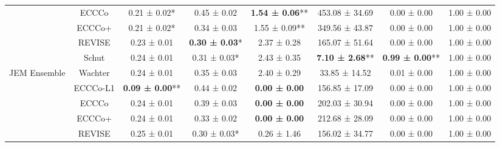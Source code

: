 \begin{table}
{\begin{tabular}[t]{cccccccc}
 & ECCCo & 0.21 ± 0.02*\hphantom{*} & 0.45 ± 0.02\hphantom{*}\hphantom{*} & \textbf{1.54 ± 0.06}** & 453.08 ± 34.69\hphantom{*}\hphantom{*} & 0.00 ± 0.00\hphantom{*}\hphantom{*} & 1.00 ± 0.00\hphantom{*}\hphantom{*}\\

 & ECCCo+ & 0.21 ± 0.02*\hphantom{*} & 0.34 ± 0.03\hphantom{*}\hphantom{*} & 1.55 ± 0.09** & 349.56 ± 43.87\hphantom{*}\hphantom{*} & 0.00 ± 0.00\hphantom{*}\hphantom{*} & 1.00 ± 0.00\hphantom{*}\hphantom{*}\\

 & REVISE & 0.23 ± 0.01\hphantom{*}\hphantom{*} & \textbf{0.30 ± 0.03}*\hphantom{*} & 2.37 ± 0.28\hphantom{*}\hphantom{*} & 165.07 ± 51.64\hphantom{*}\hphantom{*} & 0.00 ± 0.00\hphantom{*}\hphantom{*} & 1.00 ± 0.00\hphantom{*}\hphantom{*}\\

 & Schut & 0.24 ± 0.01\hphantom{*}\hphantom{*} & 0.31 ± 0.03*\hphantom{*} & 2.43 ± 0.35\hphantom{*}\hphantom{*} & \textbf{7.10 ± 2.68}** & \textbf{0.99 ± 0.00}** & 1.00 ± 0.00\hphantom{*}\hphantom{*}\\

\multirow[t]{-6}{*}{\centering\arraybackslash JEM Ensemble} & Wachter & 0.24 ± 0.01\hphantom{*}\hphantom{*} & 0.35 ± 0.03\hphantom{*}\hphantom{*} & 2.40 ± 0.29\hphantom{*}\hphantom{*} & 33.85 ± 14.52\hphantom{*}\hphantom{*} & 0.01 ± 0.00\hphantom{*}\hphantom{*} & 1.00 ± 0.00\hphantom{*}\hphantom{*}\\
\cmidrule{1-8}
 & ECCCo-L1 & \textbf{0.09 ± 0.00}** & 0.44 ± 0.02\hphantom{*}\hphantom{*} & \textbf{0.00 ± 0.00}\hphantom{*}\hphantom{*} & 156.85 ± 17.09\hphantom{*}\hphantom{*} & 0.00 ± 0.00\hphantom{*}\hphantom{*} & 1.00 ± 0.00\hphantom{*}\hphantom{*}\\

 & ECCCo & 0.24 ± 0.01\hphantom{*}\hphantom{*} & 0.39 ± 0.03\hphantom{*}\hphantom{*} & \textbf{0.00 ± 0.00}\hphantom{*}\hphantom{*} & 202.03 ± 30.94\hphantom{*}\hphantom{*} & 0.00 ± 0.00\hphantom{*}\hphantom{*} & 1.00 ± 0.00\hphantom{*}\hphantom{*}\\

 & ECCCo+ & 0.24 ± 0.01\hphantom{*}\hphantom{*} & 0.33 ± 0.02\hphantom{*}\hphantom{*} & \textbf{0.00 ± 0.00}\hphantom{*}\hphantom{*} & 212.68 ± 28.09\hphantom{*}\hphantom{*} & 0.00 ± 0.00\hphantom{*}\hphantom{*} & 1.00 ± 0.00\hphantom{*}\hphantom{*}\\

 & REVISE & 0.25 ± 0.01\hphantom{*}\hphantom{*} & 0.30 ± 0.03*\hphantom{*} & 0.26 ± 1.46\hphantom{*}\hphantom{*} & 156.02 ± 34.77\hphantom{*}\hphantom{*} & 0.00 ± 0.00\hphantom{*}\hphantom{*} & 1.00 ± 0.00\hphantom{*}\hphantom{*}\\


\end{tabular}}
\end{table}
